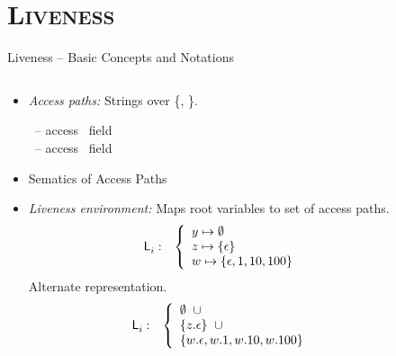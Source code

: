 \documentclass[xcolor=x11names,compress,mathserif]{beamer}
\renewcommand{\(}{\begin{columns}}
\renewcommand{\)}{\end{columns}}
\newcommand{\<}[1]{\begin{column}{#1}}
\renewcommand{\>}{\end{column}}
\begin{document}
\section{\scshape Liveness}
\begin{frame}{Liveness -- Basic Concepts and Notations}
\small
\begin{columns}
  \begin{column}[T]{0.75\textwidth}
  \begin{itemize}\itemsep0.75em
  \item {\em Access paths:} Strings over \{\acar, \acdr\}.

\hspace*{.25cm}   \acar\  -- access \CAR\ field \\
\hspace*{.25cm}   \acdr\  -- access \CDR\ field 
\item {\red Sematics of Access Paths}
  \item {\em Liveness environment:} 
{Maps root variables    to set of access paths.
\begin{eqnarray*}
\mathsf{L}_{{i}}^{}&:&
\left\{\begin{array}{l}
 y \mapsto \emptyset\\
       z \mapsto \{\epsilon\}\\
       w \mapsto \{\epsilon, 1, 10, 100\}
    \end{array}\right.
\end{eqnarray*}
}
{Alternate representation.
\begin{eqnarray*}
\mathsf{L}_{{i}}^{}&:&
\left\{\begin{array}{l}
        \emptyset \;\; \cup  \\
        \{z.\epsilon\} \;\; \cup\\
        \{w.\epsilon, w.1, w.10, w.100\}
     \end{array}\right.
\end{eqnarray*} 
}
  \end{itemize}
  \end{column}
\begin{column}[T]{0.25\textwidth}
\end{column}
\end{columns}

\bigskip
\bigskip

\end{frame}
\end{document}
